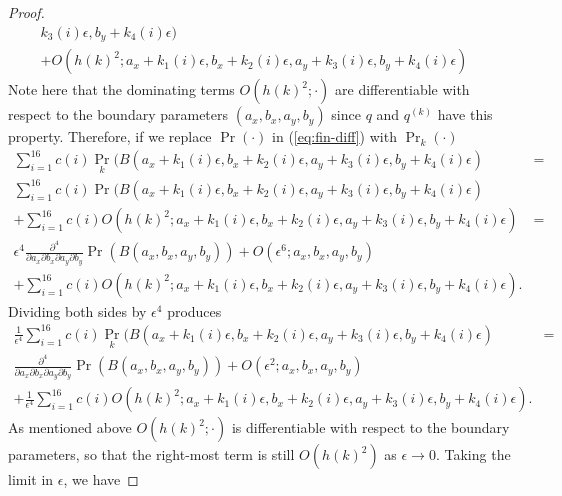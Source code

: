\begin{proof}
\begin{align*}
    k_3(i)\epsilon, b_y + k_4(i)\epsilon) &\\
    + O(h(k)^2; a_x + k_1(i)\epsilon, b_x + k_2(i)\epsilon, a_y + k_3(i)\epsilon, b_y + k_4(i)\epsilon) &
  \end{align*}
  Note here that the dominating terms $O(h(k)^2; \cdot)$ are
  differentiable with respect to the boundary parameters
  $(a_x, b_x, a_y, b_y)$ since $q$ and $q^{(k)}$ have this
  property. Therefore, if we replace $\Pr(\cdot)$ in
  (\ref{eq:fin-diff}) with $\Pr_k(\cdot)$
  \begin{align*}
    \sum_{i=1}^{16} c(i) \Pr_k(B(a_x + k_1(i)\epsilon, b_x +
    k_2(i)\epsilon, a_y + k_3(i)\epsilon, b_y + k_4(i)\epsilon) &= \\
    \sum_{i=1}^{16} c(i) \Pr(B(a_x + k_1(i)\epsilon, b_x +
    k_2(i)\epsilon, a_y + k_3(i)\epsilon, b_y + k_4(i)\epsilon) &  \\
    + \sum_{i=1}^{16} c(i) O(h(k)^2; a_x + k_1(i)\epsilon, b_x +
    k_2(i)\epsilon, a_y + k_3(i)\epsilon, b_y + k_4(i)\epsilon) &= \\
    \epsilon^4 \frac{\partial^4}{\partial a_x \partial b_x \partial
    a_y \partial b_y} \Pr(B(a_x, b_x, a_y, b_y)) + O(\epsilon^6 ;
    a_x, b_x, a_y, b_y) & \\
    + \sum_{i=1}^{16} c(i) O(h(k)^2; a_x + k_1(i)\epsilon, b_x +
    k_2(i)\epsilon, a_y + k_3(i)\epsilon, b_y + k_4(i)\epsilon). &
  \end{align*}
  Dividing both sides by $\epsilon^4$ produces
  \begin{align*}
    \frac{1}{\epsilon^4} \sum_{i=1}^{16} c(i) \Pr_k(B(a_x + k_1(i)\epsilon, b_x +
    k_2(i)\epsilon, a_y + k_3(i)\epsilon, b_y + k_4(i)\epsilon) &= \\
    \frac{\partial^4}{\partial a_x \partial b_x \partial
    a_y \partial b_y} \Pr(B(a_x, b_x, a_y, b_y)) + O(\epsilon^2;
    a_x, b_x, a_y, b_y) \\
    + \frac{1}{\epsilon^4}\sum_{i=1}^{16} c(i) O(h(k)^2; a_x + k_1(i)\epsilon, b_x +
    k_2(i)\epsilon, a_y + k_3(i)\epsilon, b_y + k_4(i)\epsilon).
  \end{align*}
  As mentioned above $O(h(k)^2; \cdot)$ is differentiable with respect
  to the boundary parameters, so that the right-most term is still
  $O(h(k)^2)$ as $\epsilon \to 0$. Taking the limit in $\epsilon$, we have

\end{proof}
